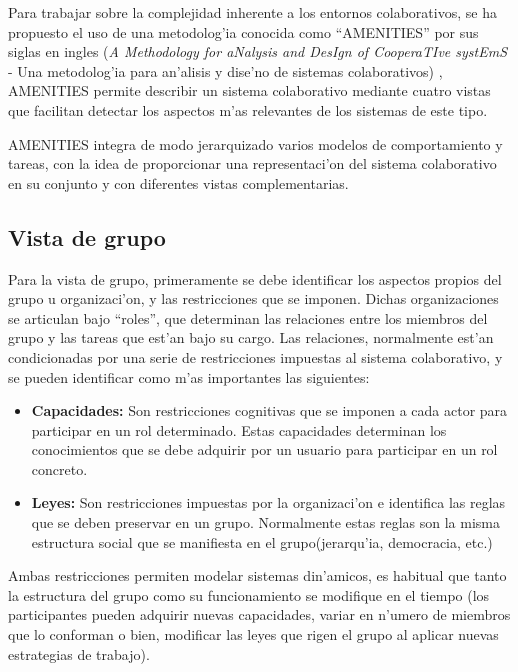 \medskip
Para trabajar sobre la complejidad inherente a los entornos colaborativos, se ha propuesto el uso de una metodolog'ia conocida como ``AMENITIES'' por sus siglas en ingles (\textit{A Methodology for aNalysis and DesIgn of CooperaTIve systEmS} - Una metodolog'ia para an'alisis y dise'no de sistemas colaborativos) \cite{gea2002amenities}, AMENITIES permite describir un sistema colaborativo mediante cuatro vistas que facilitan detectar los aspectos m'as relevantes de los sistemas de este tipo.

\medskip
AMENITIES integra de modo jerarquizado varios modelos de comportamiento y tareas, con la idea de proporcionar una representaci'on del sistema colaborativo en su conjunto y con diferentes vistas complementarias. 


\subsection{Vista de grupo}

Para la vista de grupo, primeramente se debe identificar los aspectos propios del grupo u organizaci'on, y las restricciones que se imponen. Dichas organizaciones se articulan bajo ``roles'', que determinan las relaciones entre los miembros del grupo y las tareas que est'an bajo su cargo. Las relaciones, normalmente est'an condicionadas por una serie de restricciones impuestas al sistema colaborativo, y se pueden identificar como m'as importantes las siguientes:

\begin{itemize}
	\item \textbf{Capacidades:} Son restricciones cognitivas que se imponen a cada actor para participar en un rol determinado. Estas capacidades determinan los conocimientos que se debe adquirir por un usuario para participar en un rol concreto.
    \item \textbf{Leyes:} Son restricciones impuestas por la organizaci'on e identifica las reglas que se deben preservar en un grupo. Normalmente estas reglas son la misma estructura social que se manifiesta en el grupo(jerarqu'ia, democracia, etc.)
\end{itemize}

Ambas restricciones permiten modelar sistemas din'amicos, es habitual que tanto la estructura del grupo como su funcionamiento se modifique en el tiempo (los participantes pueden adquirir nuevas capacidades, variar en n'umero de miembros que lo conforman o bien, modificar las leyes que rigen el grupo al aplicar nuevas estrategias de trabajo). 


